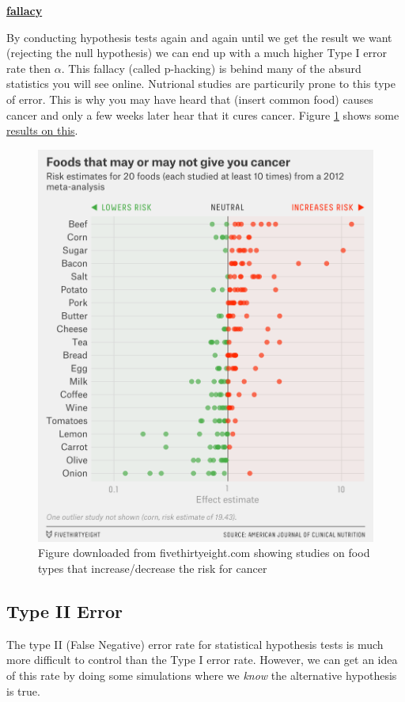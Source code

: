 \documentclass[
]{book}
\newenvironment{rmdblock}[1]
  {\begin{shaded*}
  \centerline{\underline{\textbf{#1}}}

  }
  {
  \end{shaded*}
  }
\newenvironment{fallacy}
  {\begin{rmdblock}{fallacy}}
  {\end{rmdblock}}
\theoremstyle{definition}
\theoremstyle{definition}
\theoremstyle{definition}
\theoremstyle{definition}
\theoremstyle{remark}
\begin{document}
\begin{fallacy}
By conducting hypothesis tests again and again until we get the result we want (rejecting the null hypothesis) we can end up with a much higher Type I error rate then \(\alpha\). This fallacy (called p-hacking) is behind many of the absurd statistics you will see online. Nutrional studies are particurily prone to this type of error. This is why you may have heard that (insert common food) causes cancer and only a few weeks later hear that it cures cancer. Figure \ref{fig:phack538} shows some \href{https://fivethirtyeight.com/features/you-cant-trust-what-you-read-about-nutrition/}{results on this}.
\end{fallacy}

\begin{figure}
\includegraphics[width=0.5\linewidth,height=0.5\textheight]{phack} \caption{Figure downloaded from fivethirtyeight.com showing studies on food types that increase/decrease the risk for cancer}\label{fig:phack538}
\end{figure}

\hypertarget{type-ii-error}{%
\subsection{Type II Error}\label{type-ii-error}}

The type II (False Negative) error rate for statistical hypothesis tests is much more difficult to control than the Type I error rate. However, we can get an idea of this rate by doing some simulations where we \emph{know} the alternative hypothesis is true.
\end{document}
